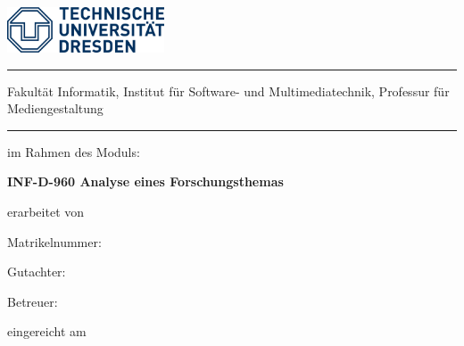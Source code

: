 \makeatletter
\begin{titlepage}
	\RaggedRight
	\includegraphics[width=0.35\textwidth]{resources/logoTUD.png}\par\vspace{0cm}
	\noindent\rule{\textwidth}{0.4pt}
	{\normalfont\mdseries\small\sffamily Fakultät Informatik,}
	{\normalfont\mdseries\small\sffamily Institut für Software- und Multimediatechnik, Professur für Mediengestaltung}
	\vspace{2mm}\noindent\hrule
	\vspace{3cm}
	{\normalfont\Large \thesistype \par}
	\vspace{1cm}
	{\normalfont\Huge\mdseries\sffamily \@title\par}
	\vspace{1.5cm}
	{\normalfont\large im Rahmen des Moduls:\par}
	{\normalfont\Large\bfseries INF-D-960 Analyse eines Forschungsthemas \par}
	\vspace{1cm}
	{\sffamily\large\mdseries erarbeitet von\par}
	\vspace{1.5mm}
	{\normalfont\Large \@author\par}
	\vspace{0.5mm}
	{\normalfont\large Matrikelnummer: \matnr \par}
	\vspace{3.0cm}
	{\sffamily\large Gutachter:\par}
    \vspace{1mm}
	{\normalfont\large \gutachter \par}
	\vspace{7mm}
	{\sffamily\large Betreuer:\par}
	\vspace{0.7mm}
	{\normalfont\large \betreuer \par}
	\vspace{1cm}
	{\sffamily\large\mdseries eingereicht am\par}
	\vspace{1mm}
	{\normalfont\normalsize \@date \par}
\end{titlepage}
\makeatother
